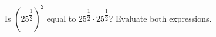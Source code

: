 Is $\left(25^{\dfrac{1}{2}}\right)^2$ equal to $25^{\dfrac{1}{2}}\cdot25^{\dfrac{1}{2}}$? Evaluate both expressions.
